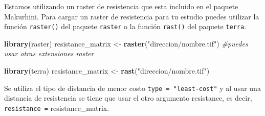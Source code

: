 \documentclass[
]{book}
\newenvironment{Shaded}{\begin{snugshade}}{\end{snugshade}}
\newcommand{\CommentTok}[1]{\textcolor[rgb]{0.56,0.35,0.01}{\textit{#1}}}
\newcommand{\FunctionTok}[1]{\textcolor[rgb]{0.13,0.29,0.53}{\textbf{#1}}}
\newcommand{\NormalTok}[1]{#1}
\newcommand{\OtherTok}[1]{\textcolor[rgb]{0.56,0.35,0.01}{#1}}
\newcommand{\StringTok}[1]{\textcolor[rgb]{0.31,0.60,0.02}{#1}}
\begin{document}
Estamos utilizando un raster de resistencia que esta incluido en el paquete Makurhini. Para cargar un raster de resistencia para tu estudio puedes utilizar la función \texttt{raster()} del paquete \texttt{raster} o la función \texttt{rast()} del paquete \texttt{terra}.

\begin{Shaded}
\begin{Highlighting}[]
\FunctionTok{library}\NormalTok{(raster)}
\NormalTok{resistance\_matrix }\OtherTok{\textless{}{-}} \FunctionTok{raster}\NormalTok{(}\StringTok{"direccion/nombre.tif"}\NormalTok{) }\CommentTok{\#puedes usar otras extensiones raster}

\FunctionTok{library}\NormalTok{(terra)}
\NormalTok{resistance\_matrix }\OtherTok{\textless{}{-}} \FunctionTok{rast}\NormalTok{(}\StringTok{"direccion/nombre.tif"}\NormalTok{) }
\end{Highlighting}
\end{Shaded}

Se utiliza el tipo de distancia de menor costo \texttt{type\ =\ "least-cost"} y al usar una distancia de resistencia se tiene que usar el otro argumento resistance, es decir, \texttt{resistance\ =} resistance\_matrix.
\end{document}
